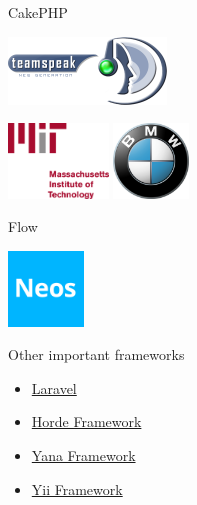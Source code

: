 \begin{frame}{CakePHP}
	\begin{center}
		\includegraphics[height=1.8cm]{img/cake/teamspeak.png}
	\end{center}
	
	\begin{center}
		\includegraphics[height=2cm]{img/cake/mit.png}
		\hfill
		\includegraphics[height=2cm]{img/cake/bmw.png}
	\end{center}
\end{frame}

\begin{frame}{Flow}
	\begin{center}
		\includegraphics[height=2cm]{img/flow/neos.png}
	\end{center}
\end{frame}

\begin{frame}{Other important frameworks}
	\begin{itemize}
		\item \href{https://laravel.com}{Laravel}
		\item \href{http://www.horde.org/}{Horde Framework}
		\item \href{http://yanaframework.net/pages/index.php?language=de}{Yana Framework}
		\item \href{http://www.yiiframework.com/}{Yii Framework}
	\end{itemize}
\end{frame}